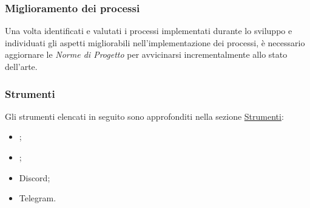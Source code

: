 \subsubsection{Miglioramento dei processi}
Una volta identificati e valutati i processi implementati durante lo sviluppo e individuati gli aspetti migliorabili nell'implementazione dei processi, è necessario aggiornare le \textit{Norme di Progetto} per avvicinarsi incrementalmente allo stato dell'arte.


\subsubsection{Strumenti}
Gli strumenti elencati in seguito sono approfonditi nella sezione \hyperref[sec:strumenti]{Strumenti}:
\begin{itemize}
    \item {};
    \item {};
    \item Discord;
    \item Telegram.
\end{itemize}